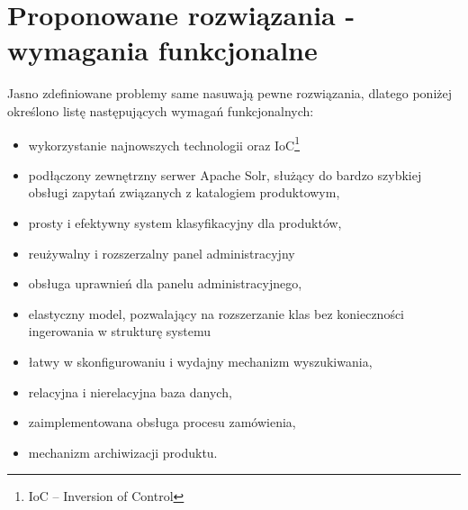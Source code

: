 \section{Proponowane rozwiązania - wymagania funkcjonalne}
Jasno zdefiniowane problemy same nasuwają pewne rozwiązania, dlatego poniżej określono listę następujących wymagań funkcjonalnych:
\begin{itemize}
	\item wykorzystanie najnowszych technologii oraz IoC\footnote{IoC -- Inversion of Control}
	\item podłączony zewnętrzny serwer Apache Solr, służący do bardzo szybkiej obsługi zapytań związanych z katalogiem produktowym,
	\item prosty i efektywny system klasyfikacyjny dla produktów,
	\item reużywalny i rozszerzalny panel administracyjny 
	\item obsługa uprawnień dla panelu administracyjnego,
	\item elastyczny model, pozwalający na rozszerzanie klas bez konieczności ingerowania w strukturę systemu
	\item łatwy w skonfigurowaniu i wydajny mechanizm wyszukiwania,
	\item relacyjna i nierelacyjna baza danych,
	\item zaimplementowana obsługa procesu zamówienia,
	\item mechanizm archiwizacji produktu.
\end{itemize} 

